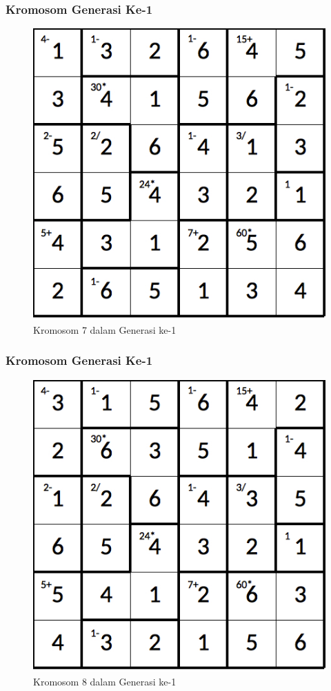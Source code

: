 \documentclass{beamer}
\begin{document}
\begin{frame}
\frametitle{Kromosom Generasi Ke-1}
\begin{figure}
\centering
\captionsetup{justification=centering}
\includegraphics[scale=0.333]{Gambar/hybridgenetic/Generation1Chromosome7}
\caption[Kromosom 7 dalam Generasi ke-1]{Kromosom 7 dalam Generasi ke-1}
\label{fig:analisisg1k7}
\end{figure}
\end{frame}

\note{

}

\begin{frame}
\frametitle{Kromosom Generasi Ke-1}
\begin{figure}
\centering
\captionsetup{justification=centering}
\includegraphics[scale=0.333]{Gambar/hybridgenetic/Generation1Chromosome8}
\caption[Kromosom 8 dalam Generasi ke-1]{Kromosom 8 dalam Generasi ke-1}
\label{fig:analisisg1k8}
\end{figure}
\end{frame}
\end{document}
